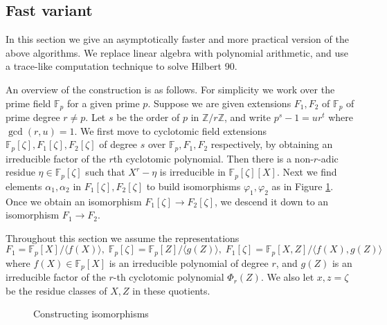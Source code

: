 \documentclass[12pt]{article}
\theoremstyle{plain}
\theoremstyle{definition}
\def\F{\ensuremath{\mathbb{F}}}
\newcounter{algorithm}
\begin{document}
\subsection{Fast variant}
In this section we give an asymptotically faster and more practical version of the above 
algorithms. We replace linear algebra with polynomial arithmetic, and use a trace-like computation 
technique to solve Hilbert 90. 

An overview of the construction is as follows. For simplicity we 
work over the prime field $\F_p$ for a given prime $p$. Suppose we are given extensions $F_1, F_2$ 
of $\F_p$ of prime degree $r \ne p$. Let $s$ be the order of $p$ in $\mathbb{Z} / r\mathbb{Z}$, and 
write $p^s - 1 = ur^t$ where $\gcd(r, u) = 1$. We first move to cyclotomic field extensions 
$\F_p[\zeta], F_1[\zeta], F_2[\zeta]$ of degree $s$ over $\F_p, F_1, F_2$ respectively, by 
obtaining an irreducible factor of the $r$th cyclotomic polynomial. Then there is a non-$r$-adic 
residue $\eta \in \F_p[\zeta]$ such that $X^r - \eta$ is irreducible in $\F_p[\zeta][X]$. Next we 
find elements $\alpha_1, \alpha_2$ in $F_1[\zeta], F_2[\zeta]$ to build isomorphisms $\varphi_1, 
\varphi_2$ as in Figure \ref{figure:isom1}. Once we obtain an isomorphism $F_1[\zeta] \rightarrow 
F_2[\zeta]$, we descend it down to an isomorphism $F_1 \rightarrow F_2$. 

Throughout this section we assume the representations
\begin{equation}
\label{equation:rep}
F_1 = \F_p[X] / \langle f(X) \rangle, \; \F_p[\zeta] = \F_p[Z] / \langle g(Z) \rangle, \;
F_1[\zeta] = \F_p[X, Z] / \langle f(X), g(Z) \rangle
\end{equation}
where $f(X) \in \F_p[X]$ is an irreducible polynomial of degree $r$, and $g(Z)$ is an irreducible 
factor of the $r$-th cyclotomic polynomial $\Phi_r(Z)$. We also let $x, z = \zeta$ be the residue 
classes of $X, Z$ in these quotients.
\begin{figure}
	\begin{center}
		\caption{Constructing isomorphisms}
		\label{figure:isom1}
	\end{center}
\end{figure}
\end{document}
